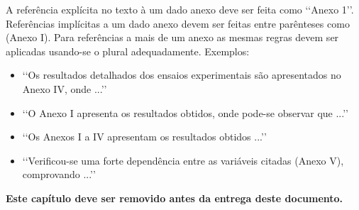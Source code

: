 A referência explícita no texto à um dado anexo deve ser feita como \lq\lq Anexo 1\rq\rq. Referências implícitas a um dado anexo devem ser feitas entre parênteses como (Anexo I). Para referências a mais de um anexo as mesmas regras devem ser aplicadas usando-se o plural adequadamente. Exemplos:
\begin{itemize}
	\item \lq\lq Os resultados detalhados dos ensaios experimentais são 
	apresentados no Anexo IV, onde ...\rq\rq

	\item \lq\lq O Anexo I apresenta os resultados obtidos, onde pode-se 
	observar que ...\rq\rq

	\item \lq\lq Os Anexos I a IV apresentam os resultados obtidos ...\rq\rq

	\item \lq\lq Verificou-se uma forte dependência entre as variáveis citadas 
	(Anexo V), comprovando ...\rq\rq
\end{itemize}

\textbf{Este capítulo deve ser removido antes da entrega deste documento.}